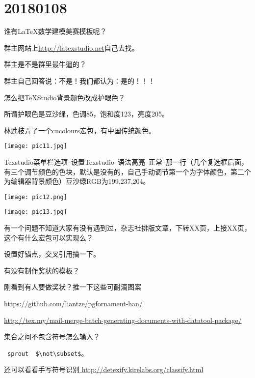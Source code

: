 \documentclass[QA.tex]{subfiles}
\begin{document}
%
%

\chapter{20180108}\label{ch180108}

\begin{qst}\label{Q2018010801}
谁有\LaTeX{}数学建模美赛模板呢？
\end{qst}
\ans 群主网站上\href{http://www.latexstudio.net/archives/category/latex-templates/mcm-tex-template}{http://latexstudio.net}自己去找。

\begin{qst}\label{Q2018010802}
群主是不是群里最牛逼的？
\end{qst}
\ans 群主自己回答说：不是！\qquad 我们都认为：是的！！！

\begin{qst}\label{Q2018010803}
怎么把TeXStudio背景颜色改成护眼色？
\end{qst}
\ans
所谓护眼色是豆沙绿，色调85，饱和度123，亮度205。

林莲枝弄了一个cncolours宏包，有中国传统颜色。

\texttt{[image: pic11.jpg]}

Texstudio菜单栏选项--设置Texstudio--语法高亮--正常--那一行（几个复选框后面，有三个调节颜色的色块，默认是没有的，自己手动调节第一个为字体颜色，第二个为编辑器背景颜色）豆沙绿RGB为199,237,204。

\texttt{[image: pic12.png]}

\texttt{[image: pic13.jpg]}

\begin{qst}\label{Q2018010804}
有一个问题不知道大家有没有遇到过，杂志社排版文章，下转XX页，上接XX页，这个有什么宏包可以实现么？
\end{qst}
\ans 设置好锚点，交叉引用搞一下。

\begin{qst}\label{Q2018010805}
有没有制作奖状的模板？
\end{qst}
\ans 刚看到有人要做奖状？推一下这些可耐滴图案

 \href{https://github.com/liantze/pgfornament-han/}%
 {https://github.com/liantze/pgfornament-han/}  
 
 \href{http://tex.my/mail-merge-batch-generating-documents-with-datatool-package/}%
 {http://tex.my/mail-merge-batch-generating-documents-with-datatool-package/}

\begin{qst}\label{Q2018010806}
 集合之间不包含符号怎么输入？
\end{qst}
\ans \verb| sprout  $\not\subset$|。

还可以看看手写符号识别\url{ http://detexify.kirelabs.org/classify.html}
\end{document}
